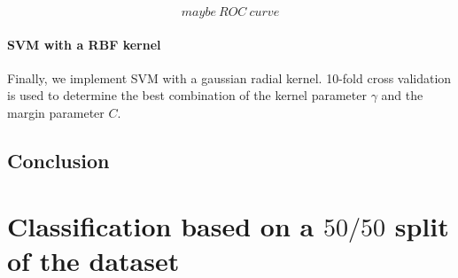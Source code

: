 $$ maybe~ROC~curve$$

\paragraph{SVM with a RBF kernel}
Finally, we implement SVM with a gaussian radial kernel. \num{10}-fold cross validation is used to determine the best combination of the kernel parameter $ \gamma $ and the margin parameter $C$. 

\subsection{Conclusion}

\section{Classification based on a $50/50$ split of the dataset}
\label{sec_our_strat}

